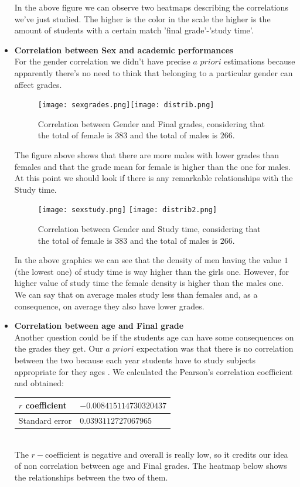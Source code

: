 \documentclass[a4paper, 11pt]{report}
\theoremstyle{definition}
\numberwithin{equation}{section}		%
\numberwithin{figure}{section}			%
\numberwithin{table}{section}				%
\begin{document}
\begin{itemize}
In the above figure we can observe two heatmaps describing the correlations we've just studied. The higher is the color in the scale the higher is the amount of students with a certain match 'final grade'-'study time'.


\item \textbf{Correlation between Sex and academic performances}
\\For the gender correlation we didn't have precise $a$ $priori$ estimations because apparently there's no need to think that belonging to a particular gender can affect grades.

\begin{figure}[h]\centering
\texttt{[image: sexgrades.png]}\quad\texttt{[image: distrib.png]}
\caption{Correlation between Gender and Final grades, considering that the total of female is $383$ and the total of males is $266$.}
\end{figure}

The figure above shows that there are more males with lower grades than females and that the grade mean for female is higher than the one for males. At this point we should look if there is any remarkable relationships with the Study time.

\begin{figure}[h]\centering
\texttt{[image: sexstudy.png]}
\texttt{[image: distrib2.png]}
\caption{Correlation between Gender and Study time, considering that the total of female is $383$ and the total of males is $266$.}
\end{figure}

In the above graphics we can see that the density of men having the value $1$ (the lowest one) of study time is way higher than the girls one. However, for higher value of study time the female density is higher than the males one. We can say that on average males study less than females and, as a consequence, on average they also have lower grades.



\item \textbf{Correlation between age and Final grade}
\\Another question could be if the students age can have some consequences on the grades they get. Our $a$ $priori$ expectation was that there is no correlation between the two because each year students have to study subjects appropriate for they ages . We calculated the Pearson's correlation coefficient and obtained:
\begin{center}
\begin{tabular}{|p{3cm}|p{4cm}|}
$r$ coefficient & $-0.008415114730320437$ \\
\hline
Standard error & $0.0393112727067965$ \\
\hline
\end{tabular}
\end{center}
\\The $r-$coefficient is negative and overall is really low, so it credits our idea of non correlation between age and Final grades. The heatmap below shows the relationships between the two of them.


\end{itemize}
\end{document}
